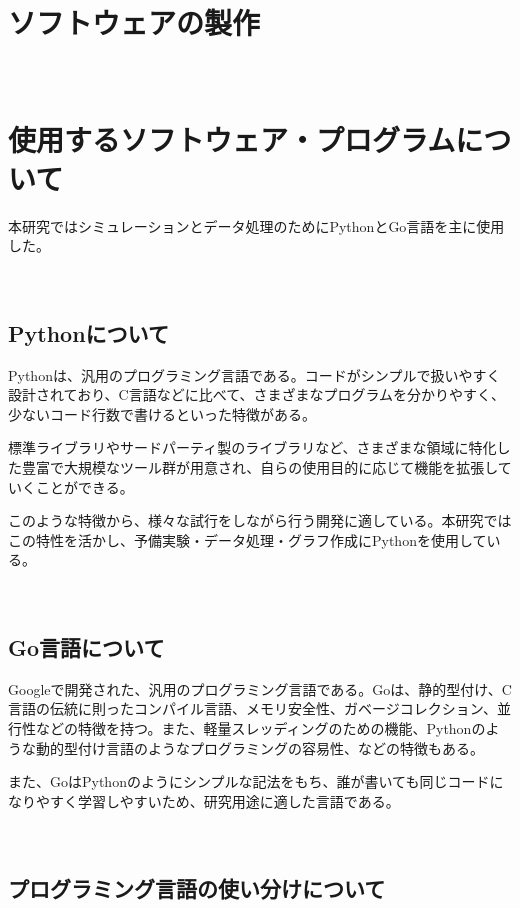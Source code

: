 \
\section{ソフトウェアの製作}\label{ux30bdux30d5ux30c8ux30a6ux30a7ux30a2ux306eux88fdux4f5c}

\
\section{使用するソフトウェア・プログラムについて}\label{ux4f7fux7528ux3059ux308bux30bdux30d5ux30c8ux30a6ux30a7ux30a2ux30d7ux30edux30b0ux30e9ux30e0ux306bux3064ux3044ux3066}

本研究ではシミュレーションとデータ処理のためにPythonとGo言語を主に使用した。

\
\subsection{Pythonについて}\label{pythonux306bux3064ux3044ux3066}

Pythonは、汎用のプログラミング言語である。コードがシンプルで扱いやすく設計されており、C言語などに比べて、さまざまなプログラムを分かりやすく、少ないコード行数で書けるといった特徴がある。

標準ライブラリやサードパーティ製のライブラリなど、さまざまな領域に特化した豊富で大規模なツール群が用意され、自らの使用目的に応じて機能を拡張していくことができる。

このような特徴から、様々な試行をしながら行う開発に適している。本研究ではこの特性を活かし、予備実験・データ処理・グラフ作成にPythonを使用している。

\
\subsection{Go言語について}\label{goux8a00ux8a9eux306bux3064ux3044ux3066}

Googleで開発された、汎用のプログラミング言語である。Goは、静的型付け、C言語の伝統に則ったコンパイル言語、メモリ安全性、ガベージコレクション、並行性などの特徴を持つ。また、軽量スレッディングのための機能、Pythonのような動的型付け言語のようなプログラミングの容易性、などの特徴もある。

また、GoはPythonのようにシンプルな記法をもち、誰が書いても同じコードになりやすく学習しやすいため、研究用途に適した言語である。

\
\subsection{プログラミング言語の使い分けについて}\label{ux30d7ux30edux30b0ux30e9ux30dfux30f3ux30b0ux8a00ux8a9eux306eux4f7fux3044ux5206ux3051ux306bux3064ux3044ux3066}


